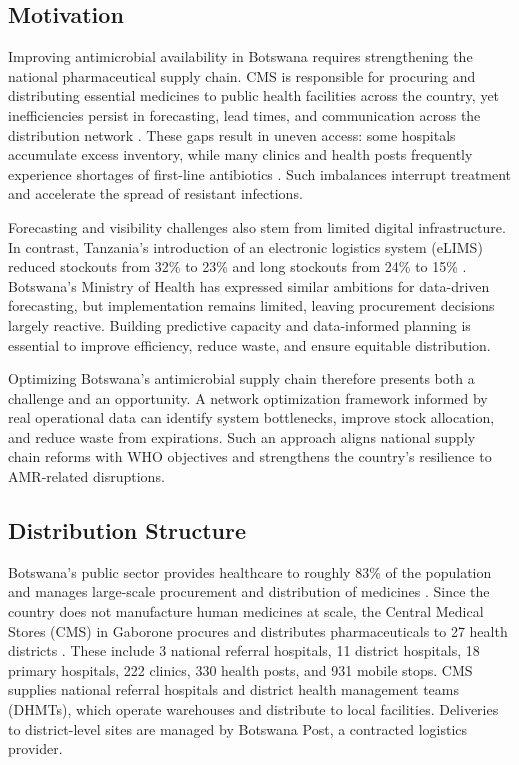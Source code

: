 \documentclass{article}
\begin{document}
\subsection{Motivation}

Improving antimicrobial availability in Botswana requires strengthening the national pharmaceutical supply chain. CMS is responsible for procuring and distributing essential medicines to public health facilities across the country, yet inefficiencies persist in forecasting, lead times, and communication across the distribution network \cite{modutlwa2023}. These gaps result in uneven access: some hospitals accumulate excess inventory, while many clinics and health posts frequently experience shortages of first-line antibiotics \cite{modutlwa2023}. Such imbalances interrupt treatment and accelerate the spread of resistant infections.  

Forecasting and visibility challenges also stem from limited digital infrastructure. In contrast, Tanzania’s introduction of an electronic logistics system (eLIMS) reduced stockouts from 32\% to 23\% and long stockouts from 24\% to 15\% \cite{mwencha2016}. Botswana’s Ministry of Health has expressed similar ambitions for data-driven forecasting, but implementation remains limited, leaving procurement decisions largely reactive. Building predictive capacity and data-informed planning is essential to improve efficiency, reduce waste, and ensure equitable distribution.  

Optimizing Botswana’s antimicrobial supply chain therefore presents both a challenge and an opportunity. A network optimization framework informed by real operational data can identify system bottlenecks, improve stock allocation, and reduce waste from expirations. Such an approach aligns national supply chain reforms with WHO objectives and strengthens the country’s resilience to AMR-related disruptions.  

\subsection{Distribution Structure}

Botswana’s public sector provides healthcare to roughly 83\% of the population and manages large-scale procurement and distribution of medicines \cite{cali2016hfg}. Since the country does not manufacture human medicines at scale, the Central Medical Stores (CMS) in Gaborone procures and distributes pharmaceuticals to 27 health districts \cite{ghsc2021botswana}. These include 3 national referral hospitals, 11 district hospitals, 18 primary hospitals, 222 clinics, 330 health posts, and 931 mobile stops. CMS supplies national referral hospitals and district health management teams (DHMTs), which operate warehouses and distribute to local facilities. Deliveries to district-level sites are managed by Botswana Post, a contracted logistics provider.  
\end{document}
